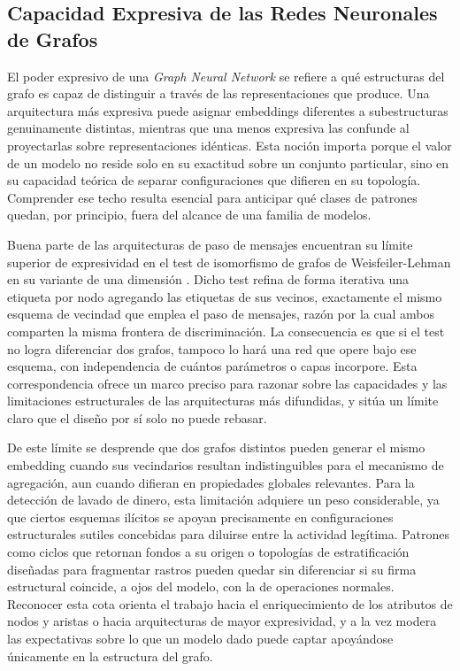 \subsection{Capacidad Expresiva de las Redes Neuronales de Grafos}

El poder expresivo de una \textit{Graph Neural Network} se refiere a qué estructuras del grafo es capaz de distinguir a través de las representaciones que produce. Una arquitectura más expresiva puede asignar embeddings diferentes a subestructuras genuinamente distintas, mientras que una menos expresiva las confunde al proyectarlas sobre representaciones idénticas. Esta noción importa porque el valor de un modelo no reside solo en su exactitud sobre un conjunto particular, sino en su capacidad teórica de separar configuraciones que difieren en su topología. Comprender ese techo resulta esencial para anticipar qué clases de patrones quedan, por principio, fuera del alcance de una familia de modelos.

Buena parte de las arquitecturas de paso de mensajes encuentran su límite superior de expresividad en el test de isomorfismo de grafos de Weisfeiler-Lehman en su variante de una dimensión \cite{Xu2019HowPowerful}. Dicho test refina de forma iterativa una etiqueta por nodo agregando las etiquetas de sus vecinos, exactamente el mismo esquema de vecindad que emplea el paso de mensajes, razón por la cual ambos comparten la misma frontera de discriminación. La consecuencia es que si el test no logra diferenciar dos grafos, tampoco lo hará una red que opere bajo ese esquema, con independencia de cuántos parámetros o capas incorpore. Esta correspondencia ofrece un marco preciso para razonar sobre las capacidades y las limitaciones estructurales de las arquitecturas más difundidas, y sitúa un límite claro que el diseño por sí solo no puede rebasar.

De este límite se desprende que dos grafos distintos pueden generar el mismo embedding cuando sus vecindarios resultan indistinguibles para el mecanismo de agregación, aun cuando difieran en propiedades globales relevantes. Para la detección de lavado de dinero, esta limitación adquiere un peso considerable, ya que ciertos esquemas ilícitos se apoyan precisamente en configuraciones estructurales sutiles concebidas para diluirse entre la actividad legítima. Patrones como ciclos que retornan fondos a su origen o topologías de estratificación diseñadas para fragmentar rastros pueden quedar sin diferenciar si su firma estructural coincide, a ojos del modelo, con la de operaciones normales. Reconocer esta cota orienta el trabajo hacia el enriquecimiento de los atributos de nodos y aristas o hacia arquitecturas de mayor expresividad, y a la vez modera las expectativas sobre lo que un modelo dado puede captar apoyándose únicamente en la estructura del grafo.

